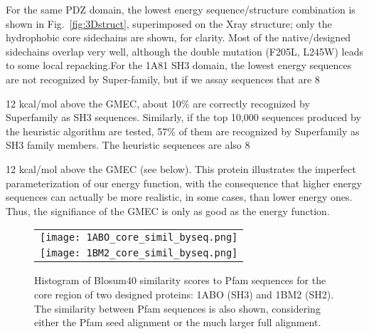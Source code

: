 For the same PDZ domain, the lowest energy sequence/structure combination is shown in Fig.\  \ref{fig:3Dstruct}, superimposed on the Xray structure; only the hydrophobic core sidechains are shown, for clarity. Most of the native/designed sidechains overlap very well, although the double mutation (F205L, L245W) leads to some local repacking.For the 1A81 SH3 domain, the lowest energy sequences are not recognized by Super-family, but if we assay sequences that are 8{12 kcal/mol above the GMEC, about 10\% are correctly recognized by Superfamily as SH3 sequences. Similarly, if the top 10,000 sequences produced by the heuristic algorithm are tested, 57\% of them are recognized by Superfamily as SH3 family members. The heuristic sequences are also 8{12 kcal/mol above the GMEC (see below). This protein illustrates the imperfect parameterization of our energy function, with the consequence that higher energy sequences can actually be more realistic, in some cases, than lower energy ones. Thus, the signifiance of the GMEC is only as good as the energy function.


    \begin{figure}[!htbp]
      \centering
      \begin{tabular}{c}
        \texttt{[image: 1ABO\_core\_simil\_byseq.png]} \\
        \texttt{[image: 1BM2\_core\_simil\_byseq.png]} \\
      \end{tabular}
      \caption[width=1cm]{\small 
Histogram of Blosum40 similarity scores to Pfam sequences for the core region of two
designed proteins: 1ABO (SH3) and 1BM2 (SH2). The similarity between Pfam sequences is
also shown, considering either the Pfam seed alignment or the much larger full alignment.
}
      \label{fig:similarity}
    \end{figure}





}}

